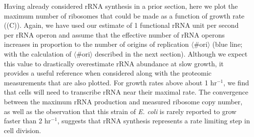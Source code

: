 
Having already considered rRNA synthesis in a prior section, here we  plot the
maximum number of ribosomes that could be made as a function of growth rate
((C)). Again, we have used our estimate of 1 functional rRNA
unit per second per rRNA operon and assume that the effective number of rRNA
operons increases in proportion to the number of origins of replication
$\langle\text{\# ori}\rangle$ (blue line; with the calculation of
$\langle\text{\# ori}\rangle$ described in the next section). Although we expect
this value to drastically overestimate rRNA abundance at slow growth, it
provides a useful reference when considered along with the  proteomic
measurements that are also plotted. For growth rates above about 1 hr$^{-1}$, we
find that cells will need to transcribe rRNA near their maximal rate. The
convergence between the maximum rRNA production and measured ribosome copy
number, as well as the observation that this strain of \textit{E. coli} is
rarely reported to grow faster than 2 hr$^{-1}$, suggests that rRNA synthesis
represents a rate limiting step in cell division. 
